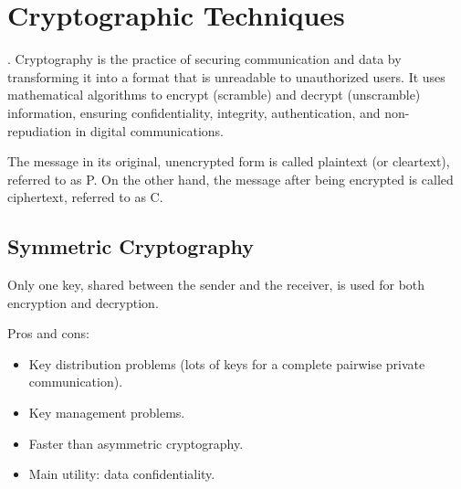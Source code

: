 \chapter{Cryptographic Techniques}
\cite{02_basic_crypto}.
Cryptography is the practice of securing communication and data by transforming it into a format that is unreadable to unauthorized users. It uses mathematical algorithms to encrypt (scramble) and decrypt (unscramble) information, ensuring confidentiality, integrity, authentication, and non-repudiation in digital communications.

The message in its original, unencrypted form is called plaintext (or cleartext), referred to as P. On the other hand, the message after being encrypted is called ciphertext, referred to as C. 

\section{Symmetric Cryptography}
\begin{center}
    Only one key, shared between the sender and the receiver, is used for both encryption and decryption. 
\end{center}
Pros and cons:
\begin{itemize}
    \item Key distribution problems (lots of keys for a complete pairwise private communication).
    \item Key management problems.
    \item Faster than asymmetric cryptography.
    \item Main utility: data confidentiality.
\end{itemize}



